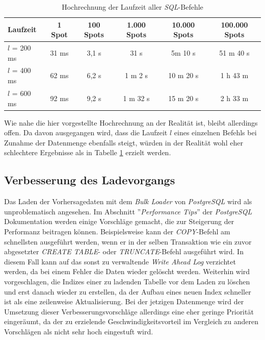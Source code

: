 \begin{table}[h]
  \centering
  {\sf
    \footnotesize
    \begin{longtable}{l|c|c|c|c|c}

      \toprule
      \textbf{Laufzeit} & \textbf{1 Spot} & \textbf{100 Spots} & \textbf{1.000 Spots} & \textbf{10.000 Spots} & \textbf{100.000 Spots} \\
      \midrule
      $l$ = 200 ms & 31 ms & 3,1 s & 31 s &  5m 10 s &  51 m 40 s \\
      $l$ = 400 ms & 62 ms & 6,2 s & 1 m 2 s & 10 m 20 s & 1 h 43 m \\
      $l$ = 600 ms & 92 ms & 9,2 s & 1 m 32 s & 15 m 20 s & 2 h 33 m \\
      \bottomrule

    \end{longtable}
  }

  \caption{Hochrechnung der Laufzeit aller \textit{SQL}-Befehle}
  \label{tab:sql_laufzeit}

\end{table}

Wie nahe die hier vorgestellte Hochrechnung an der Realität ist,
bleibt allerdings offen. Da davon ausgegangen wird, dass die Laufzeit
$l$ eines einzelnen Befehls bei Zunahme der Datenmenge ebenfalls
steigt, würden in der Realität wohl eher schlechtere Ergebnisse als in
Tabelle \ref{tab:sql_laufzeit} erzielt werden.

\subsection{Verbesserung des Ladevorgangs}
Das Laden der Vorhersagedaten mit dem \textit{Bulk Loader} von
\textit{PostgreSQL} wird als unproblematisch angesehen. Im Abschnitt
''\textit{Performance Tips}'' \cite{postgresql:performance} der
\textit{PostgreSQL} Dokumentation werden einige Vorschläge gemacht,
die zur Steigerung der Performanz beitragen können. Beispielsweise
kann der \textit{COPY}-Befehl am schnellsten ausgeführt werden, wenn
er in der selben Transaktion wie ein zuvor abgesetzter \textit{CREATE
  TABLE}- oder \textit{TRUNCATE}-Befehl ausgeführt wird. In diesem
Fall kann auf das sonst zu verwaltende \textit{Write Ahead Log}
verzichtet werden, da bei einem Fehler die Daten wieder gelöscht
werden. Weiterhin wird vorgeschlagen, die Indizes einer zu ladenden
Tabelle vor dem Laden zu löschen und erst danach wieder zu erstellen,
da der Aufbau eines neuen Index schneller ist als eine zeilenweise
Aktualisierung. Bei der jetzigen Datenmenge wird der Umsetzung dieser
Verbesserungsvorschläge allerdings eine eher geringe Priorität
eingeräumt, da der zu erzielende Geschwindigkeitsvorteil im Vergleich
zu anderen Vorschlägen als nicht sehr hoch eingestuft wird.


